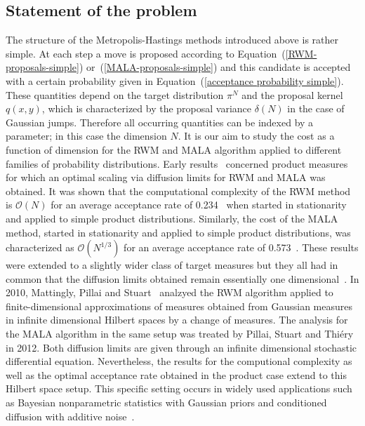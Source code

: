 \subsection*{Statement of the problem}

The structure of the Metropolis-Hastings methods introduced above is rather simple. At each step a move is proposed according to Equation~(\ref{RWM-proposals-simple}) or~(\ref{MALA-proposals-simple}) and this candidate is accepted with a certain probability given in Equation~(\ref{acceptance probability simple}). These quantities depend on the target distribution $ \pi^{N} $ and the proposal kernel $ q(x,y) $, which is characterized by the proposal variance $ \delta(N) $ in the case of Gaussian jumps. Therefore all occurring quantities can be indexed by a parameter; in this case the dimension $N$. It is our aim to study the cost as a function of dimension for the RWM and MALA algorithm applied to different families of probability distributions. Early results~\autocite{Roberts1997, Roberts1998} concerned product measures for which an optimal scaling via diffusion limits for RWM and MALA was obtained. It was shown that the computational complexity of the RWM method  is $\mathcal{O}(N)$ for an average acceptance rate of 0.234~\autocite{Roberts1997} when started in stationarity and applied to simple product distributions. Similarly, the cost of the MALA method, started in stationarity and applied to simple product distributions, was characterized as $\mathcal{O}(N^{1/3})$ for an average acceptance rate of 0.573~\autocite{Roberts1998}. These results were  extended to a slightly wider class of target measures but they all had in common that the diffusion limits obtained remain essentially one dimensional~\autocite{Bedard2007, breyer2004, Christensen2003}. In 2010,  Mattingly, Pillai and Stuart~\autocite{Mattingly2010} analzyed the RWM algorithm applied to finite-dimensional approximations of measures obtained from Gaussian measures in infinite dimensional Hilbert spaces by a change of measures.  The analysis for the MALA algorithm in the same setup was treated by Pillai, Stuart and Thi\'{e}ry~\autocite{Pillai2012} in 2012. Both diffusion limits are given through an infinite dimensional stochastic differential equation. Nevertheless, the results for the computional complexity as well as the optimal acceptance rate obtained in the product case extend to this Hilbert space setup. This specific setting occurs in widely used applications such as Bayesian nonparametric statistics with Gaussian priors and conditioned diffusion with additive noise~\autocite{Beskos2009, Stuart2010}. 

